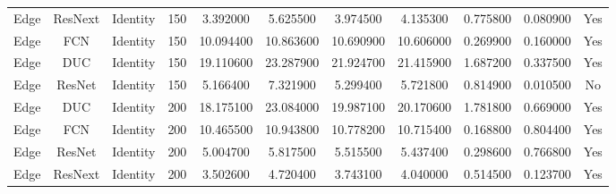 \begin{tabular}{|c||c||c||c||c||c||c||c||c||c||c|}
Edge & ResNext & Identity & 150 & 3.392000 & 5.625500 & 3.974500 & 4.135300 & 0.775800 & 0.080900 & Yes \\
Edge & FCN & Identity & 150 & 10.094400 & 10.863600 & 10.690900 & 10.606000 & 0.269900 & 0.160000 & Yes \\
Edge & DUC & Identity & 150 & 19.110600 & 23.287900 & 21.924700 & 21.415900 & 1.687200 & 0.337500 & Yes \\
Edge & ResNet & Identity & 150 & 5.166400 & 7.321900 & 5.299400 & 5.721800 & 0.814900 & 0.010500 & No \\
Edge & DUC & Identity & 200 & 18.175100 & 23.084000 & 19.987100 & 20.170600 & 1.781800 & 0.669000 & Yes \\
Edge & FCN & Identity & 200 & 10.465500 & 10.943800 & 10.778200 & 10.715400 & 0.168800 & 0.804400 & Yes \\
Edge & ResNet & Identity & 200 & 5.004700 & 5.817500 & 5.515500 & 5.437400 & 0.298600 & 0.766800 & Yes \\
Edge & ResNext & Identity & 200 & 3.502600 & 4.720400 & 3.743100 & 4.040000 & 0.514500 & 0.123700 & Yes \\
\bottomrule
\end{tabular}
